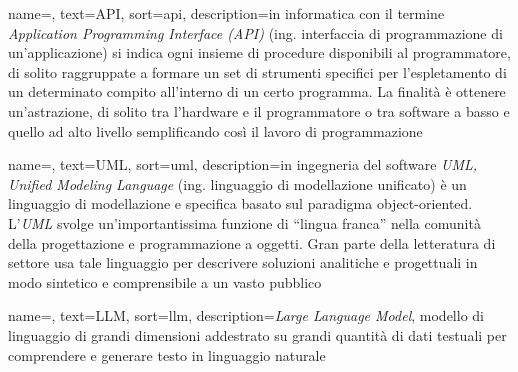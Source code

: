 





 {
    name=,
    text=API,
    sort=api,
    description={in informatica con il termine \emph{Application Programming Interface (API)} (ing. interfaccia di programmazione di un'applicazione) si indica ogni insieme di procedure disponibili al programmatore, di solito raggruppate a formare un set di strumenti specifici per l'espletamento di un determinato compito all'interno di un certo programma. La finalità è ottenere un'astrazione, di solito tra l'hardware e il programmatore o tra software a basso e quello ad alto livello semplificando così il lavoro di programmazione}
}

 {
    name=,
    text=UML,
    sort=uml,
    description={in ingegneria del software \emph{UML, Unified Modeling Language} (ing. linguaggio di modellazione unificato) è un linguaggio di modellazione e specifica basato sul paradigma object-oriented. L'\emph{UML} svolge un'importantissima funzione di ``lingua franca'' nella comunità della progettazione e programmazione a oggetti. Gran parte della letteratura di settore usa tale linguaggio per descrivere soluzioni analitiche e progettuali in modo sintetico e comprensibile a un vasto pubblico}
}

 {
    name=,
    text=LLM,
    sort=llm,
    description={\emph{Large Language Model}, modello di linguaggio di grandi dimensioni addestrato su grandi quantità di dati testuali per comprendere e generare testo in linguaggio naturale}
}

